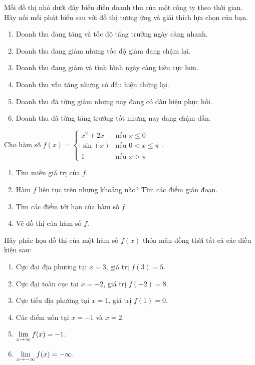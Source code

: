 \begin{exercise}
Mỗi đồ thị nhỏ dưới đây biểu diễn doanh thu của một công ty theo thời gian. Hãy nối mỗi phát biểu sau với đồ thị tương ứng và giải thích lựa chọn của bạn.

\begin{enumerate}[label=(\alph*)]
    \item Doanh thu đang tăng và tốc độ tăng trưởng ngày càng nhanh.
    \item Doanh thu đang giảm nhưng tốc độ giảm đang chậm lại.
    \item Doanh thu đang giảm và tình hình ngày càng tiêu cực hơn.
    \item Doanh thu vẫn tăng nhưng có dấu hiệu chững lại.
    \item Doanh thu đã từng giảm nhưng nay đang có dấu hiệu phục hồi.
    \item Doanh thu đã từng tăng trưởng tốt nhưng nay đang chậm dần.
\end{enumerate}
\end{exercise}

\begin{exercise}
Cho hàm số $f(x) = \begin{cases} x^2+2x & \text{nếu } x \le 0 \\ \sin(x) & \text{nếu } 0 < x \le \pi \\ 1 & \text{nếu } x > \pi \end{cases}$.
\begin{enumerate}[label=(\alph*)]
    \item Tìm miền giá trị của $f$.
    \item Hàm $f$ liên tục trên những khoảng nào? Tìm các điểm gián đoạn.
    \item Tìm các điểm tới hạn của hàm số $f$.
    \item Vẽ đồ thị của hàm số $f$.
\end{enumerate}
\end{exercise}

\begin{exercise}
Hãy phác họa đồ thị của một hàm số $f(x)$ thỏa mãn đồng thời tất cả các điều kiện sau:
\begin{enumerate}[label=(\alph*)]
    \item Cực đại địa phương tại $x=3$, giá trị $f(3) = 5$.
    \item Cực đại toàn cục tại $x=-2$, giá trị $f(-2) = 8$.
    \item Cực tiểu địa phương tại $x=1$, giá trị $f(1) = 0$.
    \item Các điểm uốn tại $x=-1$ và $x=2$.
    \item $\lim\limits_{x \to \infty} f(x) = -1$.
    \item $\lim\limits_{x \to -\infty} f(x) = -\infty$.
\end{enumerate}
\end{exercise}

